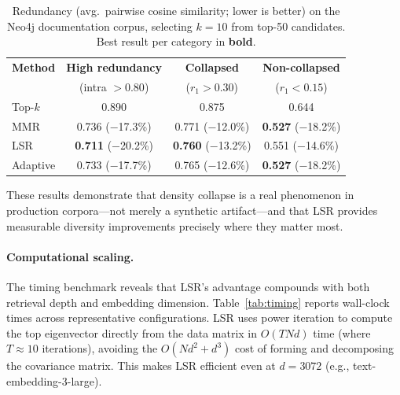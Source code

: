\documentclass{article}
\begin{document}
\begin{table}[h]
\centering
\caption{Redundancy (avg.\ pairwise cosine similarity; lower is better) on the Neo4j documentation corpus, selecting $k=10$ from top-50 candidates. Best result per category in \textbf{bold}.}
\label{tab:neo4j-results}
\begin{tabular}{@{}lccc@{}}
\toprule
\textbf{Method} & \textbf{High redundancy} & \textbf{Collapsed} & \textbf{Non-collapsed} \\
& (intra $> 0.80$) & ($r_1 > 0.30$) & ($r_1 < 0.15$) \\
\midrule
Top-$k$ & 0.890 & 0.875 & 0.644 \\
MMR & 0.736 ($-$17.3\%) & 0.771 ($-$12.0\%) & \textbf{0.527} ($-$18.2\%) \\
LSR & \textbf{0.711} ($-$20.2\%) & \textbf{0.760} ($-$13.2\%) & 0.551 ($-$14.6\%) \\
Adaptive & 0.733 ($-$17.7\%) & 0.765 ($-$12.6\%) & \textbf{0.527} ($-$18.2\%) \\
\bottomrule
\end{tabular}
\end{table}

These results demonstrate that density collapse is a real phenomenon in production corpora---not merely a synthetic artifact---and that LSR provides measurable diversity improvements precisely where they matter most.

\paragraph{Computational scaling.}
The timing benchmark reveals that LSR's advantage compounds with both retrieval depth and embedding dimension. Table~\ref{tab:timing} reports wall-clock times across representative configurations. LSR uses power iteration to compute the top eigenvector directly from the data matrix in $O(TNd)$ time (where $T \approx 10$ iterations), avoiding the $O(Nd^2 + d^3)$ cost of forming and decomposing the covariance matrix. This makes LSR efficient even at $d = 3072$ (e.g., text-embedding-3-large).
\end{document}
